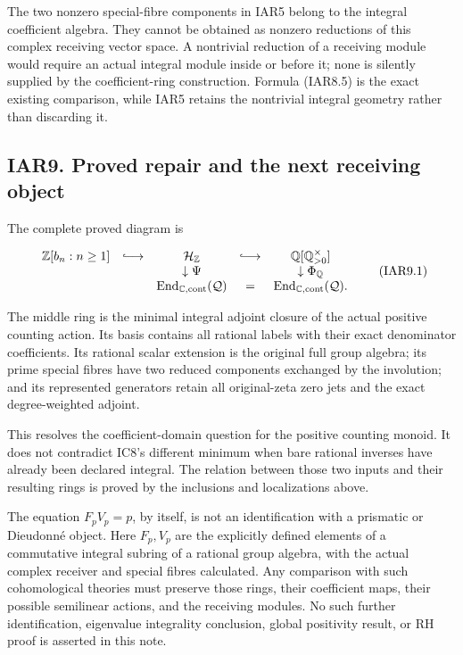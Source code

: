 \documentclass[
]{article}
\newcounter{none} %
\begin{document}
The two nonzero special-fibre components in IAR5 belong to the integral
coefficient algebra. They cannot be obtained as nonzero reductions of
this complex receiving vector space. A nontrivial reduction of a
receiving module would require an actual integral module inside or
before it; none is silently supplied by the coefficient-ring
construction. Formula (IAR8.5) is the exact existing comparison, while
IAR5 retains the nontrivial integral geometry rather than discarding it.

\subsection{IAR9. Proved repair and the next receiving
object}\label{iar9.-proved-repair-and-the-next-receiving-object}

The complete proved diagram is

\[
\begin{array}{ccccc}
\mathbb Z[b_n:n\ge1]&\lhook\joinrel\longrightarrow&
\mathcal H_{\mathbb Z}&\lhook\joinrel\longrightarrow&
\mathbb Q[\mathbb Q_{>0}^{\times}]\\
&&\downarrow\Psi&&\downarrow\Phi_{\mathbb Q}\\
&&\operatorname{End}_{\mathbb C,\mathrm{cont}}(\mathcal Q)
&=&\operatorname{End}_{\mathbb C,\mathrm{cont}}(\mathcal Q).
\end{array}
\tag{IAR9.1}
\]

The middle ring is the minimal integral adjoint closure of the actual
positive counting action. Its basis contains all rational labels with
their exact denominator coefficients. Its rational scalar extension is
the original full group algebra; its prime special fibres have two
reduced components exchanged by the involution; and its represented
generators retain all original-zeta zero jets and the exact
degree-weighted adjoint.

This resolves the coefficient-domain question for the positive counting
monoid. It does not contradict IC8's different minimum when bare
rational inverses have already been declared integral. The relation
between those two inputs and their resulting rings is proved by the
inclusions and localizations above.

The equation \(F_pV_p=p\), by itself, is not an identification with a
prismatic or Dieudonné object. Here \(F_p,V_p\) are the explicitly
defined elements of a commutative integral subring of a rational group
algebra, with the actual complex receiver and special fibres calculated.
Any comparison with such cohomological theories must preserve those
rings, their coefficient maps, their possible semilinear actions, and
the receiving modules. No such further identification, eigenvalue
integrality conclusion, global positivity result, or RH proof is
asserted in this note.
\end{document}
